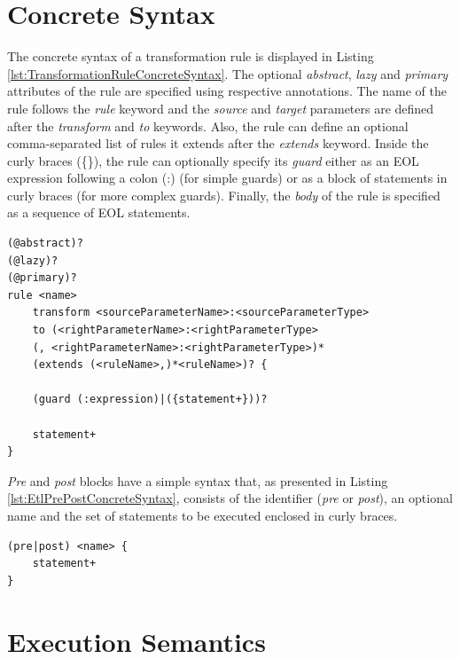 \section{Concrete Syntax}

The concrete syntax of a transformation rule is displayed in Listing \ref{lst:TransformationRuleConcreteSyntax}. The optional \emph{abstract}, \emph{lazy} and \emph{primary} attributes of the rule are specified using respective annotations. The name of the rule follows the \emph{rule} keyword and the \emph{source} and \emph{target} parameters are defined after the \emph{transform} and \emph{to} keywords. Also, the rule can define an optional comma-separated list of rules it extends after the \emph{extends} keyword. Inside the curly braces (\{\}), the rule can optionally specify its \emph{guard} either as an EOL expression following a colon (:) (for simple guards) or as a block of statements in curly braces (for more complex guards). Finally, the \emph{body} of the rule is specified as a sequence of EOL statements.

\begin{lstlisting}[basicstyle=\ttfamily\footnotesize, flexiblecolumns=true, numbers=none, nolol=true, caption=Concrete Syntax of a TransformationRule, label=lst:TransformationRuleConcreteSyntax, language=ETL, numbers=left, tabsize=2]
(@abstract)?
(@lazy)?
(@primary)?
rule <name> 
	transform <sourceParameterName>:<sourceParameterType>
	to (<rightParameterName>:<rightParameterType>
	(, <rightParameterName>:<rightParameterType>)*
	(extends (<ruleName>,)*<ruleName>)? {
	
	(guard (:expression)|({statement+}))?
	
	statement+
}
\end{lstlisting}

\emph{Pre} and \emph{post} blocks have a simple syntax that, as presented in Listing \ref{lst:EtlPrePostConcreteSyntax}, consists of the identifier (\emph{pre} or \emph{post}), an optional name and the set of statements to be executed enclosed in curly braces.

\begin{lstlisting}[basicstyle=\ttfamily\footnotesize, flexiblecolumns=true, numbers=none, nolol=true, caption=Concrete Syntax of Pre and Post blocks, label=lst:EtlPrePostConcreteSyntax, language=ETL, numbers=left, tabsize=2]
(pre|post) <name> {
	statement+
}
\end{lstlisting}

\section{Execution Semantics}
\label{sec:ETL.ExecutionSemantics}

